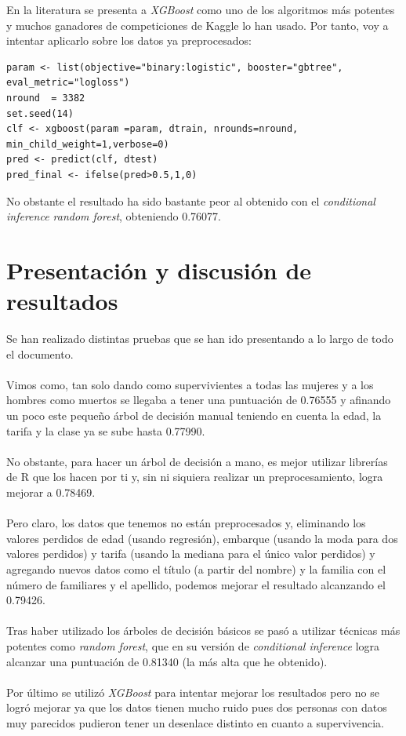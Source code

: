 En la literatura se presenta a \textit{XGBoost} como uno de los algoritmos más potentes y muchos ganadores de competiciones de Kaggle lo han usado. Por tanto, voy a intentar aplicarlo sobre los datos ya preprocesados:

\begin{lstlisting}[style=R]
param <- list(objective="binary:logistic", booster="gbtree", eval_metric="logloss")
nround  = 3382
set.seed(14)
clf <- xgboost(param =param, dtrain, nrounds=nround, min_child_weight=1,verbose=0)
pred <- predict(clf, dtest)
pred_final <- ifelse(pred>0.5,1,0) 
\end{lstlisting}

No obstante el resultado ha sido bastante peor al obtenido con el \textit{conditional inference random forest}, obteniendo 0.76077.

\section{Presentación y discusión de resultados}

Se han realizado distintas pruebas que se han ido presentando a lo largo de todo el documento.
\\ \\
Vimos como, tan solo dando como supervivientes a todas las mujeres y a los hombres como muertos se llegaba a tener una puntuación de 0.76555 y afinando un poco este pequeño árbol de decisión manual teniendo en cuenta la edad, la tarifa y la clase ya se sube hasta 0.77990.
\\ \\
No obstante, para hacer un árbol de decisión a mano, es mejor utilizar librerías de R que los hacen por ti y, sin ni siquiera realizar un preprocesamiento, logra mejorar a 0.78469.
\\ \\
Pero claro, los datos que tenemos no están preprocesados y, eliminando los valores perdidos de edad (usando regresión), embarque (usando la moda para dos valores perdidos) y tarifa (usando la mediana para el único valor perdidos) y agregando nuevos datos como el título (a partir del nombre) y la familia con el número de familiares y el apellido, podemos mejorar el resultado alcanzando el 0.79426.
\\ \\
Tras haber utilizado los árboles de decisión básicos se pasó a utilizar técnicas más potentes como \textit{random forest}, que en su versión de \textit{conditional inference} logra alcanzar una puntuación de 0.81340 (la más alta que he obtenido).
\\ \\
Por último se utilizó \textit{XGBoost} para intentar mejorar los resultados pero no se logró mejorar ya que los datos tienen mucho ruido pues dos personas con datos muy parecidos pudieron tener un desenlace distinto en cuanto a supervivencia.

